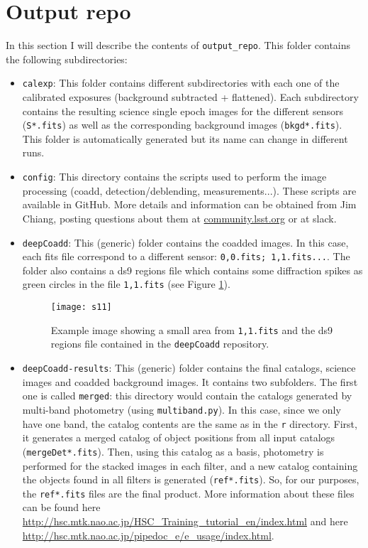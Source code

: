 \documentclass{article}
\begin{document}
\section{Output repo}
\label{sec:output_repo}
In this section I will describe the contents of \texttt{output\_repo}. This folder contains the following subdirectories:
\begin{itemize}
\item \texttt{calexp}: This folder contains different subdirectories with each one of the calibrated exposures (background subtracted + flattened). Each subdirectory contains the resulting science single epoch images for the different sensors (\texttt{S*.fits}) as well as the corresponding background images (\texttt{bkgd*.fits}). This folder is automatically generated but its name can change in different runs.
\item \texttt{config}: This directory contains the scripts used to perform the image processing (coadd, detection/deblending, measurements...). These scripts are available in GitHub. More details and information can be obtained from Jim Chiang, posting questions about them at \url{community.lsst.org} or at slack.
\item \texttt{deepCoadd}: This (generic) folder contains the coadded images. In this case, each fits file correspond to a different sensor: \texttt{0,0.fits; 1,1.fits...}. The folder also contains a ds9 regions file which contains some diffraction spikes as green circles in the file \texttt{1,1.fits} (see Figure \ref{fig:s11_reg}).

\begin{figure}
\centering
\texttt{[image: s11]}
\caption{Example image showing a small area from \texttt{1,1.fits} and the ds9 regions file contained in the \texttt{deepCoadd} repository.}
\label{fig:s11_reg}
\end{figure}

\item \texttt{deepCoadd-results}: This (generic) folder contains the final catalogs, science images and coadded background images. It contains two subfolders. The first one is called \texttt{merged}: this directory would contain the catalogs generated by multi-band photometry (using \texttt{multiband.py}). In this case, since we only have one band, the catalog contents are the same as in the \texttt{r}  directory. First, it generates a merged catalog of object positions from all input catalogs (\texttt{mergeDet*.fits}). Then, using this catalog as a basis, photometry is performed for the stacked images in each filter, and a new catalog containing the objects found in all filters is generated (\texttt{ref*.fits}). So, for our purposes, the \texttt{ref*.fits} files are the final product. More information about these files can be found here \url{http://hsc.mtk.nao.ac.jp/HSC_Training_tutorial_en/index.html} and here \url{http://hsc.mtk.nao.ac.jp/pipedoc_e/e_usage/index.html}.


\end{itemize}
\end{document}
